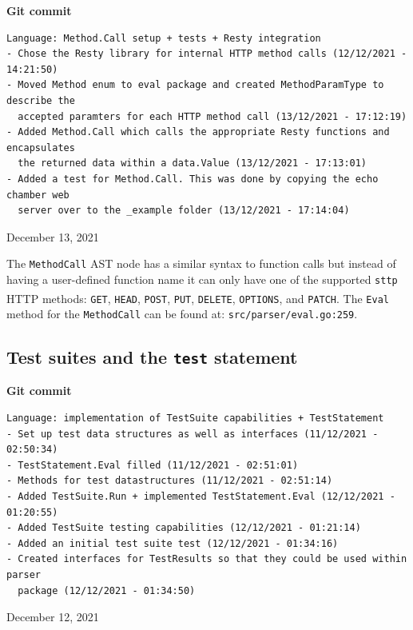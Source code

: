 \documentclass[]{full}
\theoremstyle{definition}
\begin{document}
\begin{center}
    \textbf{Git commit}
    \begin{verbatim}
Language: Method.Call setup + tests + Resty integration
- Chose the Resty library for internal HTTP method calls (12/12/2021 - 14:21:50)
- Moved Method enum to eval package and created MethodParamType to describe the
  accepted paramters for each HTTP method call (13/12/2021 - 17:12:19)
- Added Method.Call which calls the appropriate Resty functions and encapsulates
  the returned data within a data.Value (13/12/2021 - 17:13:01)
- Added a test for Method.Call. This was done by copying the echo chamber web
  server over to the _example folder (13/12/2021 - 17:14:04)
    \end{verbatim}
    \vspace{-1em}
    \tiny{December 13, 2021}
\end{center}

The \verb|MethodCall| AST node has a similar syntax to function calls but instead of having a user-defined function name it can only have one of the supported \verb|sttp| HTTP methods\textsuperscript{\cite{http_request_methods}}: \verb|GET|, \verb|HEAD|, \verb|POST|, \verb|PUT|, \verb|DELETE|, \verb|OPTIONS|, and \verb|PATCH|. The \verb|Eval| method for the \verb|MethodCall| can be found at: \verb|src/parser/eval.go:259|.

\cprotect\subsection{Test suites and the \verb|test| statement}

\begin{center}
    \textbf{Git commit}
    \begin{verbatim}
Language: implementation of TestSuite capabilities + TestStatement
- Set up test data structures as well as interfaces (11/12/2021 - 02:50:34)
- TestStatement.Eval filled (11/12/2021 - 02:51:01)
- Methods for test datastructures (11/12/2021 - 02:51:14)
- Added TestSuite.Run + implemented TestStatement.Eval (12/12/2021 - 01:20:55)
- Added TestSuite testing capabilities (12/12/2021 - 01:21:14)
- Added an initial test suite test (12/12/2021 - 01:34:16)
- Created interfaces for TestResults so that they could be used within parser
  package (12/12/2021 - 01:34:50)
    \end{verbatim}
    \vspace{-1em}
    \tiny{December 12, 2021}
\end{center}
\end{document}
